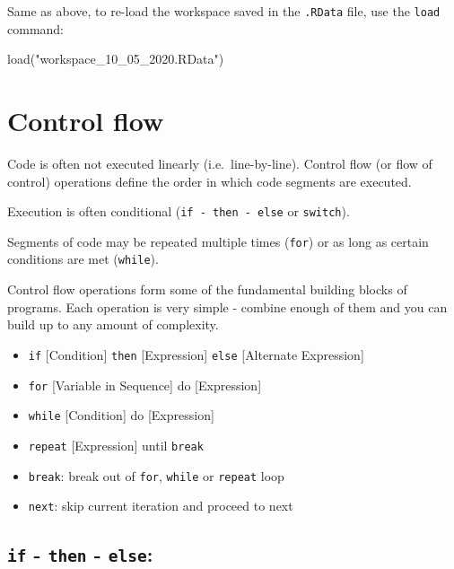 \documentclass[
]{book}
\newenvironment{Shaded}{\begin{snugshade}}{\end{snugshade}}
\newcommand{\FunctionTok}[1]{\textcolor[rgb]{0.00,0.00,0.00}{#1}}
\newcommand{\NormalTok}[1]{#1}
\newcommand{\StringTok}[1]{\textcolor[rgb]{0.31,0.60,0.02}{#1}}
\providecommand{\tightlist}{%
  \setlength{\itemsep}{0pt}\setlength{\parskip}{0pt}}
\begin{document}
Same as above, to re-load the workspace saved in the \texttt{.RData} file, use the \texttt{load} command:

\begin{Shaded}
\begin{Highlighting}[]
\FunctionTok{load}\NormalTok{(}\StringTok{"workspace\_10\_05\_2020.RData"}\NormalTok{)}
\end{Highlighting}
\end{Shaded}

\hypertarget{controlflow}{%
\chapter{Control flow}\label{controlflow}}

Code is often not executed linearly (i.e.~line-by-line). Control flow (or flow of control) operations define the order in which code segments are executed.

Execution is often conditional (\texttt{if\ -\ then\ -\ else} or \texttt{switch}).

Segments of code may be repeated multiple times (\texttt{for}) or as long as certain conditions are met (\texttt{while}).

Control flow operations form some of the fundamental building blocks of programs. Each operation is very simple - combine enough of them and you can build up to any amount of complexity.

\begin{itemize}
\tightlist
\item
  \texttt{if} {[}Condition{]} \texttt{then} {[}Expression{]} \texttt{else} {[}Alternate Expression{]}
\item
  \texttt{for} {[}Variable in Sequence{]} do {[}Expression{]}
\item
  \texttt{while} {[}Condition{]} do {[}Expression{]}
\item
  \texttt{repeat} {[}Expression{]} until \texttt{break}
\item
  \texttt{break}: break out of \texttt{for}, \texttt{while} or \texttt{repeat} loop
\item
  \texttt{next}: skip current iteration and proceed to next
\end{itemize}

\hypertarget{if---then---else}{%
\section{\texorpdfstring{\texttt{if} - \texttt{then} - \texttt{else}:}{if - then - else:}}\label{if---then---else}}
\end{document}
